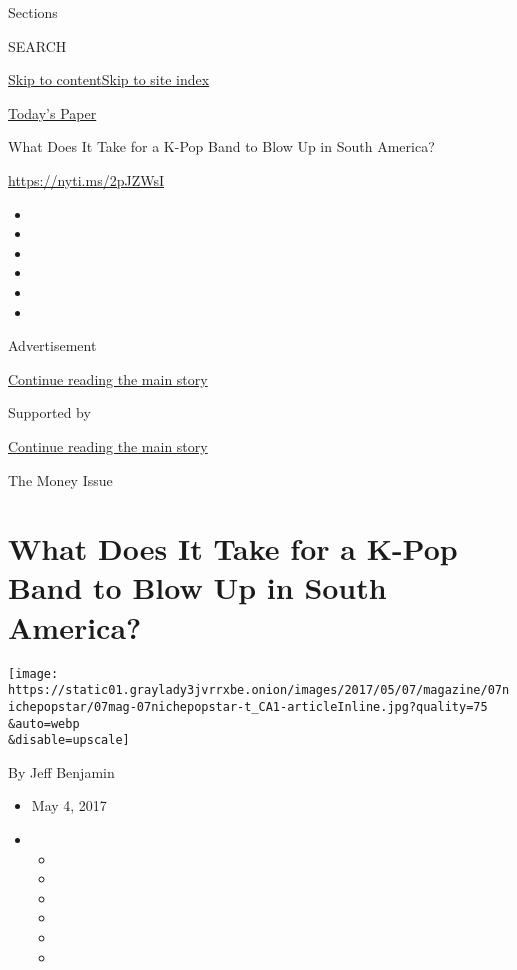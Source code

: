 Sections

SEARCH

\protect\hyperlink{site-content}{Skip to
content}\protect\hyperlink{site-index}{Skip to site index}

\href{https://myaccount.nytimes3xbfgragh.onion/auth/login?response_type=cookie\&client_id=vi}{}

\href{https://www.nytimes3xbfgragh.onion/section/todayspaper}{Today's
Paper}

What Does It Take for a K-Pop Band to Blow Up in South America?

\url{https://nyti.ms/2pJZWsI}

\begin{itemize}
\item
\item
\item
\item
\item
\item
\end{itemize}

Advertisement

\protect\hyperlink{after-top}{Continue reading the main story}

Supported by

\protect\hyperlink{after-sponsor}{Continue reading the main story}

The Money Issue

\hypertarget{what-does-it-take-for-a-k-pop-band-to-blow-up-in-south-america}{%
\section{What Does It Take for a K-Pop Band to Blow Up in South
America?}\label{what-does-it-take-for-a-k-pop-band-to-blow-up-in-south-america}}

\texttt{[image: https://static01.graylady3jvrrxbe.onion/images/2017/05/07/magazine/07nichepopstar/07mag-07nichepopstar-t\_CA1-articleInline.jpg?quality=75\\\&auto=webp\\\&disable=upscale]}

By Jeff Benjamin

\begin{itemize}
\item
  May 4, 2017
\item
  \begin{itemize}
  \item
  \item
  \item
  \item
  \item
  \item
  \end{itemize}
\end{itemize}

